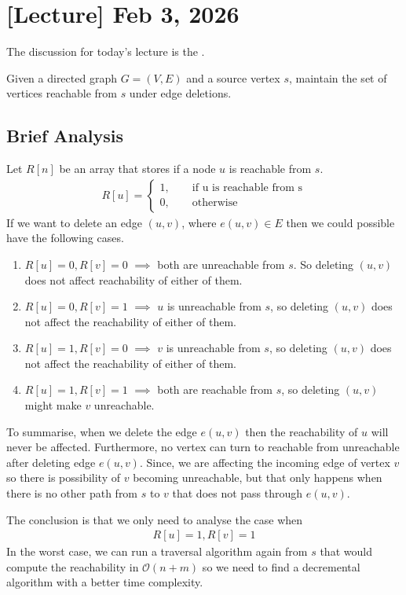 \section{[Lecture] Feb 3, 2026}
The discussion for today's lecture is the .
\begin{problem}
    Given a directed graph $G = (V, E)$ and a source vertex $s$, maintain the set of vertices reachable from $s$ under edge deletions.
\end{problem}

\subsection{Brief Analysis}
Let $R[n]$ be an array that stores if a node $u$ is reachable from $s$.
\begin{align*}
    R[u] = \begin{cases}
        1, \qquad \text{if u is reachable from s}\\ 
        0, \qquad \text{otherwise}  
    \end{cases}
\end{align*}
If we want to delete an edge $(u, v)$, where $e(u, v) \in E$ then we could possible have the following cases.
\begin{enumerate}
    \item $R[u] = 0, R[v] = 0$ $\implies$ both are unreachable from $s$. So deleting $(u, v)$ does not affect reachability of either of them.
    \item $R[u] = 0, R[v] = 1$ $\implies$ $u$ is unreachable from $s$, so deleting $(u, v)$ does not affect the reachability of either of them.
    \item $R[u] = 1, R[v] = 0$ $\implies$ $v$ is unreachable from $s$, so deleting $(u, v)$ does not affect the reachability of either of them.
    \item $R[u] = 1, R[v] = 1$ $\implies$ both are reachable from $s$, so deleting $(u,v)$ might make $v$ unreachable.
\end{enumerate}
To summarise, when we delete the edge $e(u, v)$ then the reachability of $u$ will never be affected. Furthermore, no vertex can turn to reachable from unreachable after deleting edge $e(u, v)$. Since, we are affecting the incoming edge of vertex $v$ so there is possibility of $v$ becoming unreachable, but that only happens when there is no other path from $s$ to $v$ that does not pass through $e(u, v)$.

\begin{remark}
The conclusion is that we only need to analyse the case when 
\begin{align*}
    R[u] = 1, R[v] = 1
\end{align*}
In the worst case, we can run a traversal algorithm again from $s$ that would compute the reachability in $\mathcal{O}(n + m)$ so we need to find a decremental algorithm with a better time complexity.
\end{remark}

